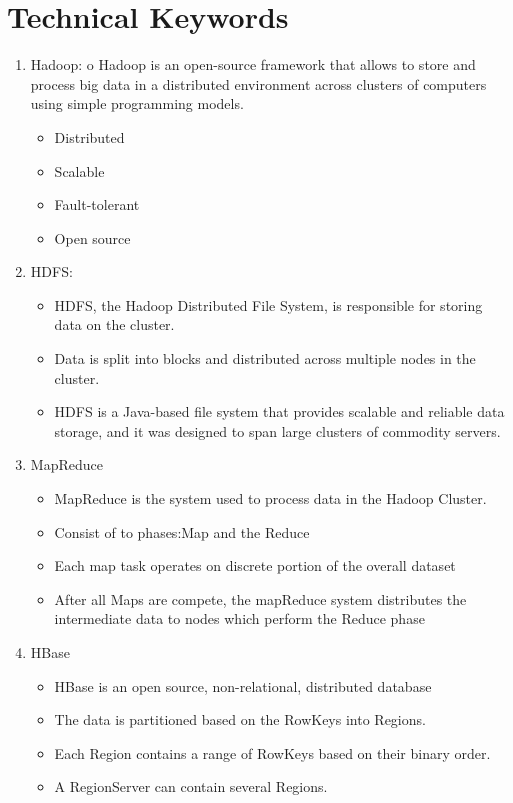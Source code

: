 \documentclass[oneside,a4paper,12pt]{report}
\begin{document}
\section{Technical Keywords}
\begin{enumerate}
\item Hadoop: o Hadoop is an open-source framework that allows to store and process big data in a distributed environment across clusters of computers using simple programming models. 
\begin{itemize}
\item Distributed
\item Scalable
\item Fault-tolerant
\item Open source
\end{itemize}

\item HDFS:
\begin{itemize}
\item HDFS, the Hadoop Distributed File System, is responsible for storing data on the cluster.
\item Data is split into blocks and distributed across multiple nodes in the cluster. 
\item HDFS is a Java-based file system that provides scalable and reliable data storage, and it was designed to span large clusters of commodity servers.
\end{itemize}


\item MapReduce
\begin{itemize}
\item MapReduce is the system used to process data in the Hadoop Cluster.
\item Consist of to phases:Map and the Reduce
\item Each map task operates on discrete portion of the overall dataset
\item After all Maps are compete, the mapReduce system distributes the intermediate data to nodes which perform the Reduce phase
\end{itemize}

\item HBase
\begin{itemize}
\item HBase is an open source, non-relational, distributed database 
\item The data is partitioned based on the RowKeys into Regions.
\item Each Region contains a range of RowKeys based on their binary order.
\item A RegionServer can contain several Regions.
\end{itemize}


\end{enumerate}
\end{document}
